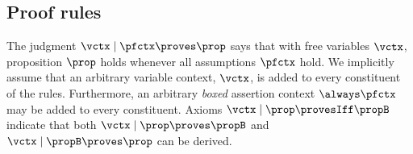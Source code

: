 
\subsection{Proof rules}
\label{sec:proof-rules}

The judgment $\vctx \mid \pfctx \proves \prop$ says that with free variables $\vctx$, proposition $\prop$ holds whenever all assumptions $\pfctx$ hold.
We implicitly assume that an arbitrary variable context, $\vctx$, is added to every constituent of the rules.
Furthermore, an arbitrary \emph{boxed} assertion context $\always\pfctx$ may be added to every constituent.
Axioms $\vctx \mid \prop \provesIff \propB$ indicate that both $\vctx \mid \prop \proves \propB$ and $\vctx \mid \propB \proves \prop$ can be derived.

\judgment{\vctx \mid \pfctx \proves \prop}

